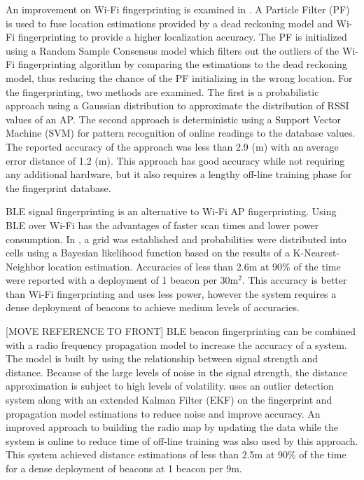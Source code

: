 \documentclass[conference]{IEEEtran}
\begin{document}
An improvement on  Wi-Fi fingerprinting is examined in \cite{wu2016improved}.  A Particle Filter (PF) is used to fuse location estimations provided by a dead reckoning model and Wi-Fi fingerprinting to provide a higher localization accuracy. The PF is initialized using a Random Sample Consensus model which filters out the outliers of the Wi-Fi fingerprinting algorithm by comparing the estimations to the dead reckoning model, thus reducing the chance of the PF initializing in the wrong location. For the fingerprinting, two methods are examined. The first is a probabilistic approach using a Gaussian distribution to approximate the distribution of RSSI values of an AP. The second approach is deterministic using a Support Vector Machine (SVM) for pattern recognition of online readings to the database values.  The reported accuracy of the approach was less than 2.9 (m) with an average error distance of 1.2 (m). This approach has good accuracy while not requiring any additional hardware, but it also requires a lengthy off-line training phase for the fingerprint database.

BLE signal fingerprinting is an alternative to Wi-Fi AP fingerprinting. Using BLE over Wi-Fi has the advantages of faster scan times and lower power consumption. In \cite{faragher2015location}, a grid was established and probabilities were distributed into cells using a Bayesian likelihood function based on the results of a K-Nearest-Neighbor location estimation. Accuracies of less than 2.6m at 90\% of the time were reported with a deployment of 1 beacon per 30m$^2$. This accuracy is better than Wi-Fi fingerprinting and uses less power, however the  system  requires a dense deployment of beacons to achieve medium levels of accuracies.

[MOVE REFERENCE TO FRONT] BLE beacon fingerprinting can be combined with a radio frequency propagation model to increase the accuracy of a system. The model is built by using the relationship between signal strength and distance. Because of the large levels of noise in the signal strength, the distance approximation is subject to high levels of volatility. \cite{zhuang2016smartphone} uses an outlier detection system along with an extended Kalman Filter (EKF) on the fingerprint and propagation model estimations to reduce noise and improve accuracy. An improved approach to building the radio map by updating the data while the system is online to reduce time of off-line training was also used by this approach. This system achieved distance estimations of less than 2.5m at 90\% of the time for a dense deployment of beacons at 1 beacon per 9m.
\end{document}
